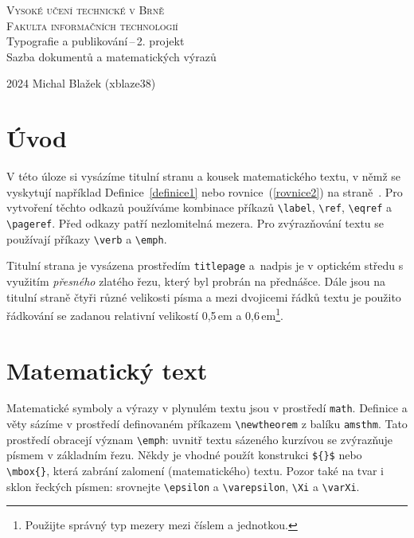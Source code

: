 \documentclass[a4paper, twocolumn, 11pt]{article}
\begin{document}
\begin{titlepage}
\begin{center}
    \Huge
    \textsc{Vysoké učení technické v Brně\\[0.5em]
    \huge{Fakulta informačních technologií}}\\
    \LARGE{Typografie a publikování\,--\,2. projekt\\[0.5em]
    Sazba dokumentů a matematických výrazů}\\
\end{center}
{\Large 2024 \hfill Michal Blažek (xblaze38)}
\end{titlepage}

\section*{Úvod}

V této úloze si vysázíme titulní stranu a kousek matematického textu, v němž se vyskytují například Definice~\ref{definice1} nebo rovnice~(\ref{rovnice2}) na straně~\pageref{rovnice2}. Pro vytvoření těchto odkazů používáme kombinace příkazů \verb|\label|, \verb|\ref|, \verb|\eqref| a \verb|\pageref|. Před odkazy patří nezlomitelná mezera. Pro zvýrazňování textu se používají příkazy \verb|\verb| a \verb|\emph|.

Titulní strana je vysázena prostředím \texttt{titlepage} a~nadpis je v optickém středu s využitím \emph{přesného} zlatého řezu, který byl probrán na přednášce. Dále jsou na titulní straně čtyři různé velikosti písma a mezi dvojicemi řádků textu je použito řádkování se zadanou relativní velikostí 0,5\,em a 0,6\,em\footnote{Použijte správný typ mezery mezi číslem a jednotkou.}.

\section{Matematický text}

Matematické symboly a výrazy v plynulém textu jsou v prostředí \texttt{math}. Definice a věty sázíme v prostředí definovaném příkazem \verb|\newtheorem| z balíku \texttt{amsthm}. Tato prostředí obracejí význam \verb|\emph|: uvnitř textu sázeného kurzívou se zvýrazňuje písmem v základním řezu. Někdy je vhodné použít konstrukci \verb|${}$| nebo \verb|\mbox{}|, která zabrání zalomení (matematického) textu. Pozor také na tvar i sklon řeckých písmen: srovnejte \verb|\epsilon| a \verb|\varepsilon|, \verb|\Xi| a \verb|\varXi|.
\end{document}
